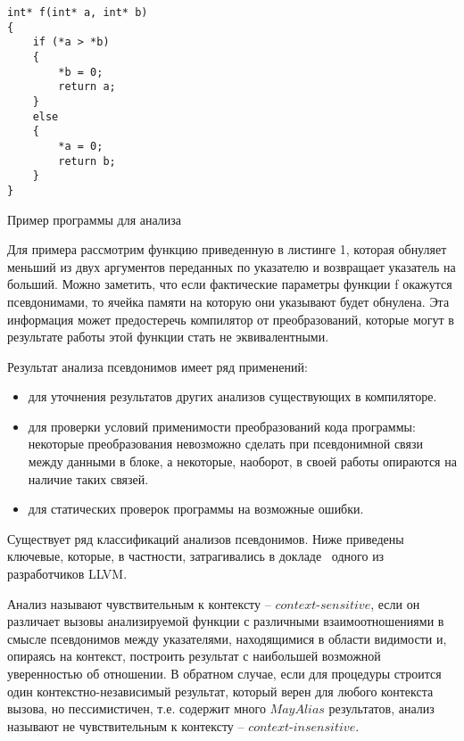 \begin{ListingEnv}[H]
\begin{lstlisting}
int* f(int* a, int* b)
{
    if (*a > *b)
    {
        *b = 0;
        return a;
    }
    else
    {
        *a = 0;
        return b;
    }
}
\end{lstlisting}
\caption{Пример программы для анализа}
\label{list:otherlevels}
\end{ListingEnv}

Для примера рассмотрим функцию приведенную в листинге 1, которая обнуляет меньший из двух аргументов переданных по указателю и возвращает указатель на больший. Можно заметить, что если фактические параметры функции f окажутся псевдонимами, то ячейка памяти на которую они указывают будет обнулена. Эта информация может предостеречь компилятор от преобразований, которые могут в результате работы этой функции стать не эквивалентными.

Результат анализа псевдонимов имеет ряд применений:
\begin{itemize}
\item для уточнения результатов других анализов существующих в компиляторе.
\item для проверки условий применимости преобразований кода программы: некоторые преобразования невозможно сделать при псевдонимной связи между данными в блоке, а некоторые, наоборот, в своей работы опираются на наличие таких связей.
\item для статических проверок программы на возможные ошибки.
\end{itemize}


Существует ряд классификаций анализов псевдонимов. Ниже приведены ключевые, которые, в частности, затрагивались в докладе~\autocite{GohmanAAinLLVM} одного из разработчиков LLVM.

Анализ называют чувствительным к контексту -- $context$-$sensitive$, если он различает вызовы анализируемой функции с различными взаимоотношениями в смысле псевдонимов между указателями, находящимися в области видимости и, опираясь на контекст, построить результат с наибольшей возможной уверенностью об отношении. В обратном случае, если для процедуры строится один контекстно-независимый результат, который верен для любого контекста вызова, но пессимистичен, т.е. содержит много $MayAlias$ результатов, анализ называют не чувствительным к контексту -- $context$-$insensitive$.
%
%

